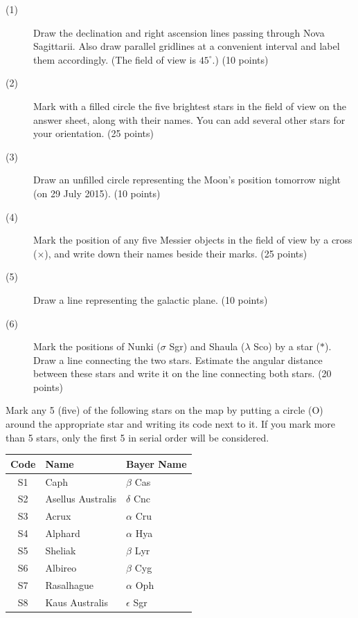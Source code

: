 \begin{description}
\item[(1)] Draw the declination and right ascension lines passing through
  Nova Sagittarii. Also draw parallel gridlines at a convenient interval and
  label them accordingly. (The field of view is $45^\circ$.)
  \hfill(10 points)
\item[(2)] Mark with a filled circle the five brightest stars in the field
  of view on the answer sheet, along with their names. You can add several
  other stars for your orientation. \hfill(25 points)
\item[(3)] Draw an unfilled circle representing the Moon's position tomorrow
  night (on 29 July 2015). \hfill(10 points)
\item[(4)] Mark the position of any five Messier objects in the field of
  view by a cross ($\times$), and write down their names beside their marks.
  \hfill(25 points)
\item[(5)] Draw a line representing the galactic plane. \hfill(10 points)
\item[(6)] Mark the positions of Nunki ($\sigma$ Sgr) and Shaula
  ($\lambda$ Sco) by a star ($*$). Draw a line connecting the two stars.
  Estimate the angular distance between these stars and write it on the line
  connecting both stars. \hfill(20 points)
\end{description}


Mark any 5 (five) of the following stars on the map by putting a circle (O)
around the appropriate star and writing its code next to it. If you mark
more than 5 stars, only the first 5 in serial order will be considered.

\begin{center}
\begin{tabular}{cll}
Code & Name & Bayer Name \\
\hline
S1 & Caph & $\beta$ Cas \\
S2 & Asellus Australis & $\delta$ Cnc \\
S3 & Acrux & $\alpha$ Cru \\
S4 & Alphard & $\alpha$ Hya \\
S5 & Sheliak & $\beta$ Lyr \\
S6 & Albireo & $\beta$ Cyg \\
S7 & Rasalhague & $\alpha$ Oph \\
S8 & Kaus Australis & $\epsilon$ Sgr \\
\end{tabular}
\end{center}

